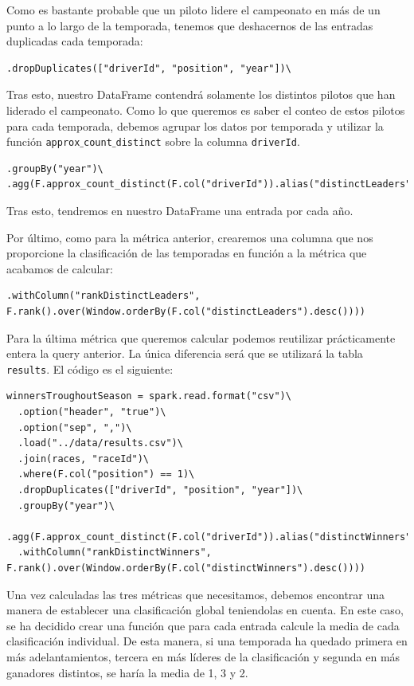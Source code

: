 \documentclass[12pt,twoside,titlepage]{report}
\begin{document}
Como es bastante probable que un piloto lidere el campeonato en más de un punto a lo largo de la temporada, tenemos que deshacernos de las entradas duplicadas cada temporada:

\begin{lstlisting}
.dropDuplicates(["driverId", "position", "year"])\
\end{lstlisting}

Tras esto, nuestro DataFrame contendrá solamente los distintos pilotos que han liderado el campeonato. Como lo que queremos es saber el conteo de estos pilotos para cada temporada, debemos agrupar los datos por temporada y utilizar la función \texttt{approx$\_$count$\_$distinct} sobre la columna \texttt{driverId}.

\begin{lstlisting}
.groupBy("year")\
.agg(F.approx_count_distinct(F.col("driverId")).alias("distinctLeaders"))\  
\end{lstlisting}

Tras esto, tendremos en nuestro DataFrame una entrada por cada año.

Por último, como para la métrica anterior, crearemos una columna que nos proporcione la clasificación de las temporadas en función a la métrica que acabamos de calcular:

\begin{lstlisting}
.withColumn("rankDistinctLeaders", F.rank().over(Window.orderBy(F.col("distinctLeaders").desc())))  
\end{lstlisting}

Para la última métrica que queremos calcular podemos reutilizar prácticamente entera la query anterior. La única diferencia será que se utilizará la tabla \texttt{results}. El código es el siguiente:

\begin{lstlisting}
winnersTroughoutSeason = spark.read.format("csv")\
  .option("header", "true")\
  .option("sep", ",")\
  .load("../data/results.csv")\
  .join(races, "raceId")\
  .where(F.col("position") == 1)\
  .dropDuplicates(["driverId", "position", "year"])\
  .groupBy("year")\
  .agg(F.approx_count_distinct(F.col("driverId")).alias("distinctWinners"))\
  .withColumn("rankDistinctWinners", F.rank().over(Window.orderBy(F.col("distinctWinners").desc())))
\end{lstlisting}

Una vez calculadas las tres métricas que necesitamos, debemos encontrar una manera de establecer una clasificación global teniendolas en cuenta. En este caso, se ha decidido crear una función que para cada entrada calcule la media de cada clasificación individual. De esta manera, si una temporada ha quedado primera en más adelantamientos, tercera en más líderes de la clasificación y segunda en más ganadores distintos, se haría la media de 1, 3 y 2.
\end{document}

